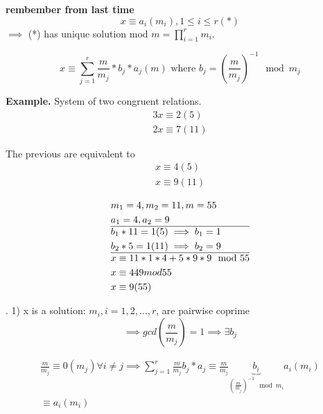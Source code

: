 


\textbf{rembember from last time}
\[
  x \equiv a_i (m_i), 1 \leq i \leq r (*)
\]
$\implies$ (*) has unique solution mod $m = \prod_{i = 1}^r m_i$. 

\[
  x \equiv \sum_{j=1}^r \frac {m}{m_j} * b_j * a_j (m) \text{ where }
  b_j = \left( \frac{m}{m_j} \right) ^{-1} \mod m_j
\]

\textbf{Example.}
System of two congruent relations.
\begin{align*}
  3x \equiv 2 (5) \\
  2x \equiv 7 (11)
\end{align*}

The previous are equivalent to
\begin{align*}
  x \equiv 4 (5) \\
  x \equiv 9 (11)
\end{align*}

\begin{align*}
  &m_1 = 4, m_2 = 11, m = 55 \\
  &a_1 = 4, a_2 = 9 \\
  \hline
  &b_1 * 11 = 1 (5)  \implies b_1 = 1 \\
  &b_2 *5 = 1 (11) \implies b_2 = 9 \\
  \hline
  & x \equiv 11 * 1 * 4 + 5 *9 *9 \mod 55\\
  & x \equiv 449 mod 55 \\
  & x \equiv 9 (55)
\end{align*}

\Proof.
1) x is a solution: $m_i, i = 1,2, \ldots, r$, are pairwise coprime 
\[
  \implies gcd(\frac{m}{m_j}) = 1 \implies \exists b_j
\]

\begin{align*}
  \frac{m}{m_j} \equiv 0 (m_j) \forall i \neq j 
    \implies \sum_{j=1}^{r}\frac{m}{m_j} b_j * a_j \equiv 
    \frac{m}{m_j} \underbrace{b_i}_{\left(\frac{m}{m_j}\right)^{-1} \mod m_i} a_i (m_i) \\
    \equiv a_i (m_i)
\end{align*}

